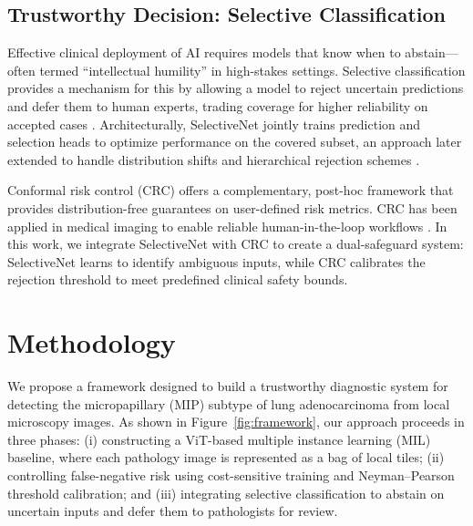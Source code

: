 \documentclass[journal]{IEEEtran}
\theoremstyle{remark}
\begin{document}
\subsection{Trustworthy Decision: Selective Classification}

Effective clinical deployment of AI requires models that know when to abstain—often termed “intellectual humility” in high-stakes settings. Selective classification provides a mechanism for this by allowing a model to reject uncertain predictions and defer them to human experts, trading coverage for higher reliability on accepted cases \cite{hendrycks2016baseline, leibig2022combining}. Architecturally, SelectiveNet \cite{geifman2019selectivenet, geifman2017selective} jointly trains prediction and selection heads to optimize performance on the covered subset, an approach later extended to handle distribution shifts and hierarchical rejection schemes \cite{goren2024hierarchical}.

Conformal risk control (CRC) \cite{angelopoulos2022conformal} offers a complementary, post-hoc framework that provides distribution-free guarantees on user-defined risk metrics. CRC has been applied in medical imaging to enable reliable human-in-the-loop workflows \cite{dvijotham2023enhancing, dai2017tumor}. In this work, we integrate SelectiveNet with CRC to create a dual-safeguard system: SelectiveNet learns to identify ambiguous inputs, while CRC calibrates the rejection threshold to meet predefined clinical safety bounds.

\section{Methodology}\label{sec:methodology}

We propose a framework designed to build a trustworthy diagnostic system for detecting the micropapillary (MIP) subtype of lung adenocarcinoma from local microscopy images. As shown in Figure~\ref{fig:framework}, our approach proceeds in three phases: (i) constructing a ViT-based multiple instance learning (MIL) baseline, where each pathology image is represented as a bag of local tiles; (ii) controlling false-negative risk using cost-sensitive training and Neyman–Pearson threshold calibration; and (iii) integrating selective classification to abstain on uncertain inputs and defer them to pathologists for review.
\end{document}
